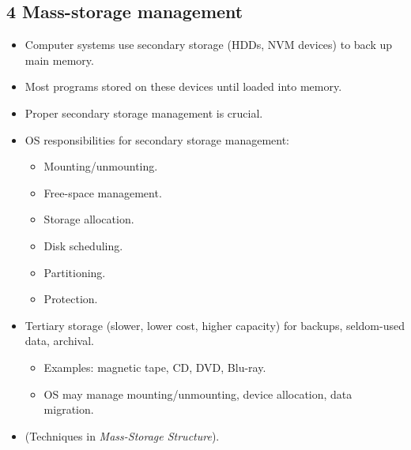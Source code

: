 \documentclass{article}
\begin{document}
\subsection*{4 Mass-storage management}
\begin{itemize}
    \item Computer systems use secondary storage (HDDs, NVM devices) to back up main memory.
    \item Most programs stored on these devices until loaded into memory.
    \item Proper secondary storage management is crucial.
    \item OS responsibilities for secondary storage management:
    \begin{itemize}
        \item Mounting/unmounting.
        \item Free-space management.
        \item Storage allocation.
        \item Disk scheduling.
        \item Partitioning.
        \item Protection.
    \end{itemize}
    \item Tertiary storage (slower, lower cost, higher capacity) for backups, seldom-used data, archival.
    \begin{itemize}
        \item Examples: magnetic tape, CD, DVD, Blu-ray.
        \item OS may manage mounting/unmounting, device allocation, data migration.
    \end{itemize}
    \item (Techniques in \textit{Mass-Storage Structure}).
\end{itemize}
\end{document}
